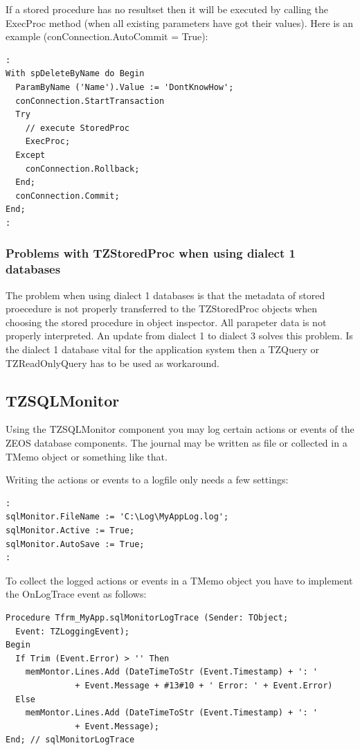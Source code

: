 \documentclass[a4paper,12pt,oneside]{book}
\begin{document}
If a stored procedure has no resultset then it will be executed by calling the ExecProc method (when all existing parameters have got their values).
Here is an example (conConnection.AutoCommit = True):

\begin{verbatim}
:
With spDeleteByName do Begin
  ParamByName ('Name').Value := 'DontKnowHow';
  conConnection.StartTransaction
  Try
    // execute StoredProc
    ExecProc;
  Except
    conConnection.Rollback;
  End;
  conConnection.Commit;
End;
:
\end{verbatim}

\subsubsection{Problems with TZStoredProc when using dialect 1 databases}
The problem when using dialect 1 databases is that the metadata of stored proecedure is not properly
transferred to the TZStoredProc objects when choosing the stored procedure in object inspector.
All parapeter data is not properly interpreted.
An update from dialect 1 to dialect 3 solves this problem.
Is the dialect 1 database vital for the application system then a TZQuery or TZReadOnlyQuery has to be used as workaround.

\subsection{TZSQLMonitor}
Using the TZSQLMonitor component you may log certain actions or events of the ZEOS database
components. The journal may be written as file or collected in a TMemo object or something like that.

Writing the actions or events to a logfile only needs a few settings:

\begin{verbatim}
:
sqlMonitor.FileName := 'C:\Log\MyAppLog.log';
sqlMonitor.Active := True;
sqlMonitor.AutoSave := True;
:
\end{verbatim}

To collect the logged actions or events in a TMemo object you have to implement the OnLogTrace event as
follows:

\begin{verbatim}
Procedure Tfrm_MyApp.sqlMonitorLogTrace (Sender: TObject; 
  Event: TZLoggingEvent);
Begin
  If Trim (Event.Error) > '' Then
    memMontor.Lines.Add (DateTimeToStr (Event.Timestamp) + ': ' 
		      + Event.Message + #13#10 + ' Error: ' + Event.Error)
  Else
    memMontor.Lines.Add (DateTimeToStr (Event.Timestamp) + ': ' 
		      + Event.Message);
End; // sqlMonitorLogTrace
\end{verbatim}
\end{document}
